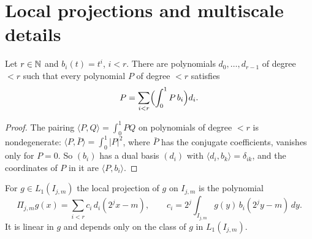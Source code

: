 \section{Local projections and multiscale details}

\begin{lemma}
\label{lem:poly-dual-basis}
\leanok
Let $r \in \mathbb{N}$ and $b_i(t) = t^i$, $i < r$. There are polynomials $d_0, \dots, d_{r-1}$ of degree
$< r$ such that every polynomial $P$ of degree $< r$ satisfies
\[
  P = \sum_{i < r} \Bigl( \int_0^1 P \, b_i \Bigr) d_i .
\]
\end{lemma}

\begin{proof}
\leanok
The pairing $\langle P, Q \rangle = \int_0^1 P Q$ on polynomials of degree $< r$ is
nondegenerate: $\langle P, \bar P \rangle = \int_0^1 |P|^2$, where $\bar P$ has the conjugate
coefficients, vanishes only for $P = 0$. So $(b_i)$ has a dual basis $(d_i)$ with
$\langle d_i, b_k \rangle = \delta_{ik}$, and the coordinates of $P$ in it are
$\langle P, b_i \rangle$.
\end{proof}

\begin{definition}
\label{def:loc-proj}
\leanok
{}
For $g \in L_1(I_{j,m})$ the local projection of $g$ on $I_{j,m}$ is the polynomial
\[
  \Pi_{j,m} g(x) = \sum_{i < r} c_i \, d_i(2^j x - m), \qquad
  c_i = 2^j \int_{I_{j,m}} g(y) \, b_i(2^j y - m) \, dy .
\]
It is linear in $g$ and depends only on the class of $g$ in $L_1(I_{j,m})$.
\end{definition}

